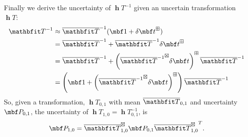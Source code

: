 \documentclass[11pt,a4,oneside]{article}
\begin{document}
Finally we derive the uncertainty of $\mbfh T^{-1}$ given an uncertain transformation $\mbfh T$:
\begin{subequations}
	\begin{flalign}
		\mbfh T^{-1} &\approx \mbfhbar T^{-1}(\mbf 1 + \mbfdel t^\boxplus)\\
		&= \mbfhbar T^{-1}  + \mbfhbar T^{-1}\mbfdel t^\boxplus\\
		&= \mbfhbar T^{-1}  + \left({\mbfhbar T^{-1}}^\boxtimes \mbfdel t\right)^\boxplus \mbfhbar T^{-1}\\
		&= \left(\mbf 1  + \left( {\mbfhbar T^{-1}}^{\boxtimes} \mbfdel t\right)^\boxplus \right)\mbfhbar T^{-1}
	\end{flalign}
\end{subequations}
So, given a transformation, $\mbfh T_{0,1}$ with mean $\mbfhbar T_{0,1}$ and uncertainty $\mbf P_{0,1}$, the uncertainty of $\mbfh T_{1,0} = \mbfh T_{0,1}^{-1}$, is 
\begin{equation}
  \label{eq:transformation-uinverse}
  \mbf P_{1,0} = \mbfhbar T_{1,0}^\boxtimes \mbf P_{0,1} {\mbfhbar T_{1,0}^\boxtimes}^T.
\end{equation}
\end{document}
